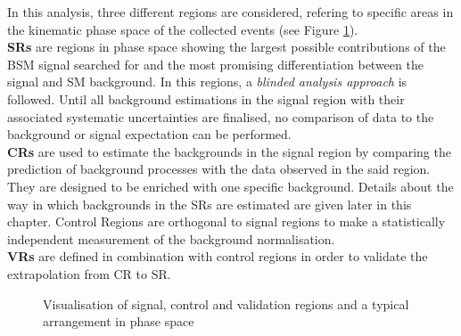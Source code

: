 In this analysis,  three different regions are considered, refering to specific areas in the kinematic phase space of the collected events (see Figure \ref{fig:stat:regions}).\\
\textbf{\acp{SR}} are regions in phase space showing the largest possible contributions of the \ac{BSM} signal searched for and the most promising differentiation between the signal and \ac{SM} background.  In this regions,  a \textit{blinded analysis approach} is followed.  Until all background estimations in the signal region with their associated systematic uncertainties are finalised,  no comparison of data to the background or signal expectation can be performed.  \\
\textbf{\acp{CR}} are used to estimate the backgrounds in the signal region by comparing the prediction of background processes with the data observed in the said region.
They are designed to be enriched with one specific background.  Details about the way in which backgrounds in the \acs{SR}s are estimated are given later in this chapter. Control Regions are orthogonal to signal regions to make a statistically independent measurement of the background normalisation.  \\
\textbf{\acp{VR}} are defined in combination with control regions in order to validate the extrapolation from \acs{CR} to \acs{SR}.

\begin{figure}
\centering
		\caption{Visualisation of signal, control and validation regions and a typical arrangement in phase space \label{fig:stat:regions}}
\end{figure}

